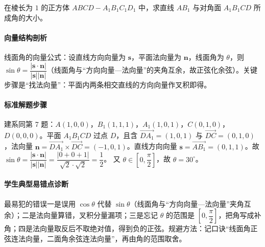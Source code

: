 \begin{problem}
在棱长为 $1$ 的正方体 $ABCD-A_1B_1C_1D_1$ 中，求直线 $AB_1$ 与对角面 $A_1B_1CD$ 所成角的大小。
\end{problem}
\begin{solution}
\paragraph{向量结构剖析}
线面角的向量公式：设直线方向向量为 $\bm s$，平面法向量为 $\bm n$，线面角为 $\theta$，则 $\sin\theta=\dfrac{|\bm s\cdot\bm n|}{|\bm s||\bm n|}$（线面角与“方向向量—法向量”的夹角互余，故正弦化余弦）。关键步骤是“找法向量”：平面内两条相交直线的方向向量作叉积即得。
\paragraph{标准解题步骤}
建系同第 7 题：$A(1,0,0)$，$B_1(1,1,1)$，$A_1(1,0,1)$，$C(0,1,0)$，$D(0,0,0)$。平面 $A_1B_1CD$ 过点 $D$，且含 $\overrightarrow{DA_1}=(1,0,1)$ 与 $\overrightarrow{DC}=(0,1,0)$，法向量 $\bm n=\overrightarrow{DA_1}\times\overrightarrow{DC}=(-1,0,1)$。直线方向向量 $\bm s=\overrightarrow{AB_1}=(0,1,1)$。故
$\sin\theta=\dfrac{|\bm s\cdot\bm n|}{|\bm s||\bm n|}=\dfrac{|0+0+1|}{\sqrt2\cdot\sqrt2}=\dfrac12$。
又 $\theta\in\left[0,\dfrac{\pi}{2}\right]$，故 $\theta=30^\circ$。
\paragraph{学生典型易错点诊断}
最易犯的错误一是误用 $\cos\theta$ 代替 $\sin\theta$（线面角与“方向向量—法向量”夹角互余）；二是法向量算错，叉积分量漏项；三是忘记 $\theta$ 的范围是 $\left[0,\dfrac{\pi}{2}\right]$，把角写成补角；四是法向量取反后不取绝对值，得到负的正弦。规避方法：记口诀“线面角正弦连法向量，二面角余弦连法向量”，再由角的范围取舍。
\end{solution}

